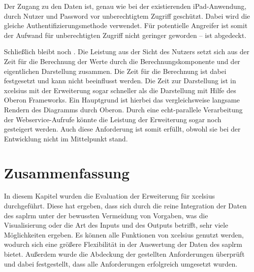 \begin{onehalfspacing}
Der Zugang zu den Daten ist, genau wie bei der existierenden iPad-Anwendung, durch Nutzer und Password vor unberechtigtem Zugriff geschützt. Dabei wird die gleiche Authentifizierungsmethode verwendet. Für potentielle Angreifer ist somit der Aufwand für unberechtigten Zugriff nicht geringer geworden --  ist abgedeckt.

Schließlich bleibt noch . Die Leistung aus der Sicht des Nutzers setzt sich aus der Zeit für die Berechnung der Werte durch die Berechnungskomponente und der eigentlichen Darstellung zusammen. Die Zeit für die Berechnung ist dabei festgesetzt und kann nicht beeinflusst werden. Die Zeit zur Darstellung ist in \gls{xcelsius} mit der Erweiterung sogar schneller als die Darstellung mit Hilfe des Oberon Frameworks. Ein Hauptgrund ist hierbei das vergleichsweise langsame Rendern des Diagramms durch Oberon. Durch eine echt-parallele Verarbeitung der Webservice-Aufrufe könnte die Leistung der Erweiterung sogar noch gesteigert werden. Auch diese Anforderung ist somit erfüllt, obwohl sie bei der Entwicklung nicht im Mittelpunkt stand.

\section{Zusammenfassung}
In diesem Kapitel wurden die Evaluation der Erweiterung für \gls{xcelsius} durchgeführt. Diese hat ergeben, dass sich durch die reine Integration der Daten des \gls{saplrm} unter der bewussten Vermeidung von Vorgaben, was die Visualisierung oder die Art des Inputs und des Outputs betrifft, sehr viele Möglichkeiten ergeben. Es können alle Funktionen von \gls{xcelsius} genutzt werden, wodurch sich eine größere Flexibilität in der Auswertung der Daten des \gls{saplrm} bietet. Außerdem wurde die Abdeckung der gestellten Anforderungen überprüft und dabei festgestellt, dass alle Anforderungen erfolgreich umgesetzt wurden.


\end{onehalfspacing}

